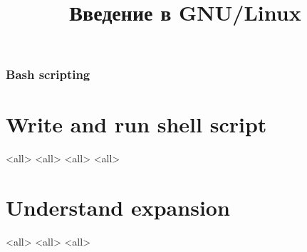 

\title{Введение в GNU/Linux}




\begin{frame}
	\frametitle{Bash scripting}
	\titlepage
	\vspace{-0.5cm}
	\begin{center}
	\end{center}
\end{frame}


\begin{frame}
	\tableofcontents
	[hideallsubsections]
\end{frame}


\section{Write and run shell script}
\mode<all>{}
\mode<all>{}
\mode<all>{}
\mode<all>{}



\section{Understand expansion}
\mode<all>{}
\mode<all>{}
\mode<all>{}

